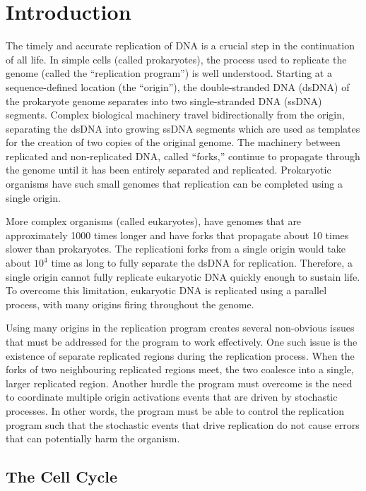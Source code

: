 \chapter{Introduction}
\label{ch:Introduction'}

The timely and accurate replication of DNA is a crucial step in the continuation of all life.
In simple cells (called prokaryotes), the process used to replicate the genome (called the ``replication program'') is well understood.
Starting at a sequence-defined location (the ``origin''), the double-stranded DNA (dsDNA) of the prokaryote genome separates into two single-stranded DNA (ssDNA) segments.
Complex biological machinery travel bidirectionally from the origin, separating the dsDNA into growing ssDNA segments which are used as templates for the creation of two copies of the original genome.
The machinery between replicated and non-replicated DNA, called ``forks,'' continue to propagate through the genome until it has been entirely separated and replicated.
Prokaryotic organisms have such small genomes that replication can be completed using a single origin. \cite{MolecularCellBiology}

More complex organisms (called eukaryotes), have genomes that are approximately 1000 times longer and have forks that propagate about 10 times slower than prokaryotes.
The replicationi forks from a single origin would take about $10^4$ time as long to fully separate the dsDNA for replication.
Therefore, a single origin cannot fully replicate eukaryotic DNA quickly enough to sustain life.
To overcome this limitation, eukaryotic DNA is replicated using a parallel process, with many origins firing throughout the genome.

Using many origins in the replication program creates several non-obvious issues that must be addressed for the program to work effectively.
One such issue is the existence of separate replicated regions during the replication process.
When the forks of two neighbouring replicated regions meet, the two coalesce into a single, larger replicated region.
Another hurdle the program must overcome is the need to coordinate multiple origin activations events that are driven by stochastic processes.
In other words, the program must be able to control the replication program such that the stochastic events that drive replication do not cause errors that can potentially harm the organism. \cite{eukaryotereview}


	\section{The Cell Cycle}
	\label{sec:CellCycle}
	
